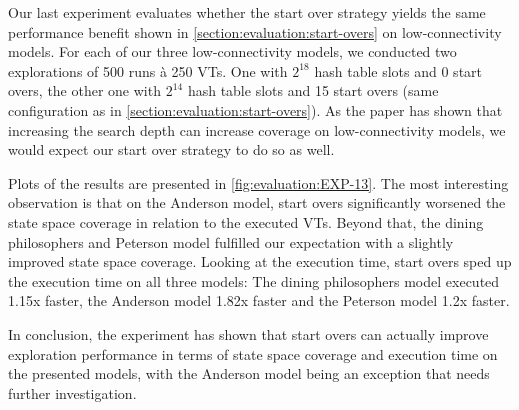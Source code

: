 \documentclass[
fancyheadings, %
%
%
]{stsreprt}
\begin{document}
Our last experiment evaluates whether the start over strategy yields the same performance benefit shown in \cref{section:evaluation:start-overs} on low-connectivity models.
For each of our three low-connectivity models, we conducted two explorations of 500 runs à 250 VTs.
One with $2^{18}$ hash table slots and 0 start overs, the other one with $2^{14}$ hash table slots and 15 start overs (same configuration as in \cref{section:evaluation:start-overs}).
As the paper has shown that increasing the search depth can increase coverage on low-connectivity models, we would expect our start over strategy to do so as well.

Plots of the results are presented in \cref{fig:evaluation:EXP-13}.
The most interesting observation is that on the Anderson model, start overs significantly worsened the state space coverage in relation to the executed VTs.
Beyond that, the dining philosophers and Peterson model fulfilled our expectation with a slightly improved state space coverage.
Looking at the execution time, start overs sped up the execution time on all three models:
The dining philosophers model executed 1.15x faster, the Anderson model 1.82x faster and the Peterson model 1.2x faster.

In conclusion, the experiment has shown that start overs can actually improve exploration performance in terms of state space coverage and execution time on the presented models, with the Anderson model being an exception that needs further investigation.
\end{document}
